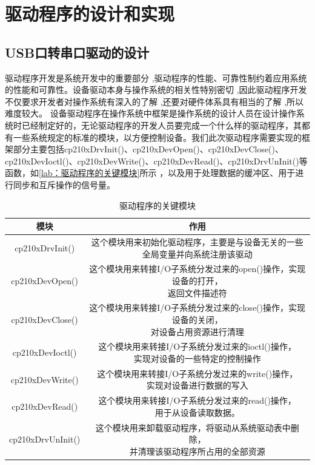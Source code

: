 \chapter{驱动程序的设计和实现}
	
\section{USB口转串口驱动的设计}
	驱动程序开发是系统开发中的重要部分 ,驱动程序的性能、可靠性制约着应用系统的性能和可靠性。设备驱动本身与操作系统的相关性特别密切 ,因此驱动程序开发不仅要求开发者对操作系统有深入的了解 ,还要对硬件体系具有相当的了解 ,所以难度较大\cite{解月江2004VxWorks设备驱动技术研究}。
	设备驱动程序在操作系统中框架是操作系统的设计人员在设计操作系统时已经制定好的，无论驱动程序的开发人员要完成一个什么样的驱动程序，其都有一些系统规定的标准的模块，以方便控制设备。我们此次驱动程序需要实现的框架部分主要包括cp210xDrvInit()、cp210xDevOpen()、cp210xDevClose()、cp210xDevIoctl()、cp210xDevWrite()、cp210xDevRead()、cp210xDrvUnInit()等函数，如\autoref{lab：驱动程序的关键模块}所示 ，以及用于处理数据的缓冲区、用于进行同步和互斥操作的信号量。
\begin{table}[!h]
\centering
\begin{tabular}{|c|c|}
\hline
{模块} & {作用} \\
\hline
{cp210xDrvInit()} & \tabincell{c}{这个模块用来初始化驱动程序，主要是与设备无关的一些\\全局变量并向系统注册该驱动} \\
\hline
{cp210xDevOpen()} & \tabincell{c}{这个模块用来转接I/O子系统分发过来的open()操作，实现设备的打开，\\返回文件描述符} \\
\hline
{cp210xDevClose()} & \tabincell{c}{这个模块用来转接I/O子系统分发过来的close()操作，实现设备的关闭，\\对设备占用资源进行清理} \\
\hline
{cp210xDevIoctl()} & \tabincell{c}{这个模块用来转接I/O子系统分发过来的ioctl()操作，\\实现对设备的一些特定的控制操作} \\
\hline
{cp210xDevWrite()} & \tabincell{c}{这个模块用来转接I/O子系统分发过来的write()操作，\\实现对设备进行数据的写入} \\
\hline
{cp210xDevRead()} & \tabincell{c}{这个模块用来转接I/O子系统分发过来的read()操作，\\用于从设备读取数据。} \\
\hline
{cp210xDrvUnInit()} & \tabincell{c}{这个模块用来卸载驱动程序，将驱动从系统驱动表中删除，\\并清理该驱动程序所占用的全部资源} \\
\hline
\end{tabular} 
\caption{驱动程序的关键模块}\label{lab：驱动程序的关键模块}
\end{table}

